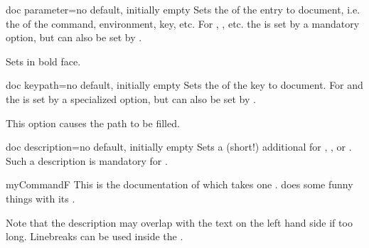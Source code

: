 \begin{docTcbKey}[][doc new={2020-04-22}]{doc parameter}{=}{no default, initially empty}
  Sets the  of the entry to document, i.e. the  of the
  command, environment, key, etc. For , , etc.
  the  is set by a mandatory option, but can also be set
  by .
\begin{dispExample}
\begin{docCommands}[
    doc no index,  %
    doc name      = textbf,
    doc parameter = \marg{text},
  ] {}
  Sets  in bold face.
\end{docCommands}
\end{dispExample}
\end{docTcbKey}



\begin{docTcbKey}[][doc new={2020-04-22}]{doc keypath}{=}{no default, initially empty}
  Sets the  of the key to document. For 
  and  the   is set by a specialized option,
  but can also be set by .
\begin{dispExample}
\begin{docKeys}[
    doc no index,  %
    doc keypath     = tikz,
    doc name        = fill,
    doc parameter   = \colOpt{=\meta{color}},
    doc description = default is scope's color setting,
  ] {}
  This option causes the path to be filled.
\end{docKeys}
\end{dispExample}
\end{docTcbKey}

\clearpage

\begin{docTcbKey}{doc description}{=}{no default, initially empty}
  Sets a (short!) additional  for
  , , or .
  Such a description is
  mandatory for .
\begin{dispExample}
\begin{docCommand*}[doc description=my description]{myCommandF}{}
  This is the documentation of  which takes one .
   does some funny things with its .
\end{docCommand*}
\end{dispExample}
\begin{marker}
Note that the description  may overlap with the text on the left
hand side if too long. Linebreaks can be used inside the .
\end{marker}
\end{docTcbKey}


